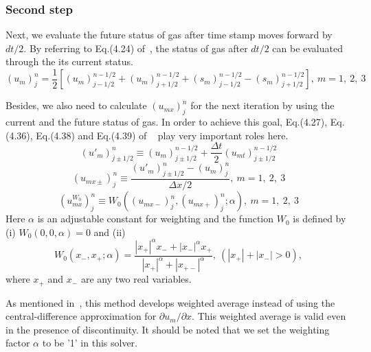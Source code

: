 \documentclass[a4paper,12pt,dvips]{article}
\begin{document}
\subsubsection{Second step}
 \label{subsubsection:second_step}
Next, we evaluate the future status of gas after time stamp moves forward
by $dt/2$. By referring to Eq.(4.24) of~\cite{CESE_Shin_Chung_Chang_1995}, the
status of gas after $dt/2$ can be evaluated through the its current status.
\begin{equation}
(u_{m})^{n}_{j}=\frac{1}{2}[(u_{m})^{n-1/2}_{j-1/2}+(u_{m})^{n-1/2}_{j+1/2}
+(s_{m})^{n-1/2}_{j-1/2}-(s_{m})^{n-1/2}_{j+1/2}],~m=1,~2,~3
\end{equation}

Besides, we also need to calculate $(u_{mx})^{n}_{j}$ for the next iteration by
using the current and the future status of gas. In order to achieve this goal, 
Eq.(4.27), Eq.(4.36), Eq.(4.38) and Eq.(4.39) 
of ~\cite{CESE_Shin_Chung_Chang_1995} play very important roles here.
\begin{equation}
(u'_{m})^{n}_{j\pm1/2}\equiv(u_{m})^{n-1/2}_{j\pm1/2}
+\frac{\Delta t}{2}(u_{mt})^{n-1/2}_{j\pm1/2}
\end{equation}
\begin{equation}
(u_{mx\pm})^{n}_{j}\equiv\frac{(u'_{m})^{n}_{j\pm1/2}-(u_{m})^{n}_{j}}{\Delta x/2}
,~m=1,~2,~3
\end{equation}
\begin{equation}
(u^{W_{0}}_{mx})^{n}_{j}\equiv W_{0}((u_{mx-})^{n}_{j},(u_{mx+})^{n}_{j};\alpha)
,~m=1,~2,~3
\end{equation}
Here $\alpha$ is an adjustable constant for weighting and the function $W_{0}$
is defined by (i) $W_{0}(0, 0, \alpha)=0$ and (ii)
\begin{equation}
W_{0}(x_{-},x_{+};\alpha )=\frac{|x_{+}|^{\alpha}x_{-}+|x_{-}|^{\alpha}x_{+}}
{|x_{+}|^{\alpha}+|x_{+-}|^{\alpha}},~(|x_{+}|+|x_{-}|>0),
\end{equation}
where $x_{+}$ and $x_{-}$ are any two real variables.

As mentioned in~\cite{CESE_Shin_Chung_Chang_1995}, this method develops weighted 
average instead of using the central-difference approximation for 
$\partial u_{m}/\partial x$. 
This weighted average is valid even in the presence of discontinuity. It should
be noted that we set the weighting factor $\alpha$ to be '1' in this solver.
\end{document}
